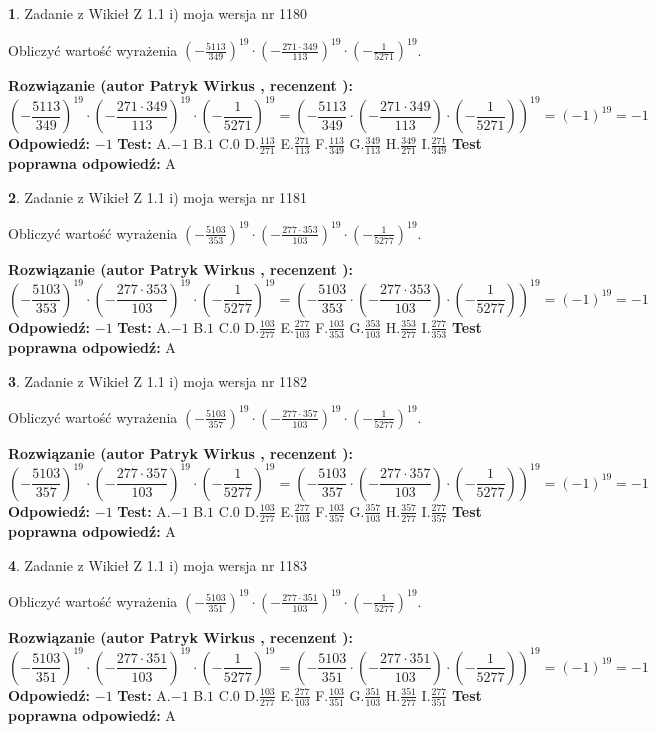 \documentclass[12pt, a4paper]{article}
\theoremstyle{definition} %
\newtheorem{zad}{}
\newcommand{\zadStart}[1]{\begin{zad}#1\newline}
\newcommand{\zadStop}{\end{zad}}
\newcommand{\rozwStart}[2]{\noindent \textbf{Rozwiązanie (autor #1 , recenzent #2): }\newline}
\newcommand{\rozwStop}{\newline}
\newcommand{\odpStart}{\noindent \textbf{Odpowiedź:}\newline}
\newcommand{\odpStop}{\newline}
\newcommand{\testStart}{\noindent \textbf{Test:}\newline}
\newcommand{\testStop}{\newline}
\newcommand{\kluczStart}{\noindent \textbf{Test poprawna odpowiedź:}\newline}
\newcommand{\kluczStop}{\newline}
\begin{document}
\zadStart{Zadanie z Wikieł Z 1.1 i) moja wersja nr 1180}

Obliczyć wartość wyrażenia $(-\frac{5113}{349})^{19} \cdot (-\frac{271 \cdot 349}{113})^{19} \cdot (-\frac{1}{5271})^{19}$.
\zadStop
\rozwStart{Patryk Wirkus}{}
$$(-\frac{5113}{349})^{19} \cdot (-\frac{271 \cdot 349}{113})^{19} \cdot (-\frac{1}{5271})^{19} = (-\frac{5113}{349} \cdot (-\frac{271 \cdot 349}{113}) \cdot (-\frac{1}{5271}))^{19} = (-1)^{19} = -1$$
\rozwStop
\odpStart
$-1$
\odpStop
\testStart
A.$-1$ B.$1$ C.$0$ D.$\frac{113}{271}$ E.$\frac{271}{113}$
F.$\frac{113}{349}$ G.$\frac{349}{113}$
H.$\frac{349}{271}$
I.$\frac{271}{349}$
\testStop
\kluczStart
A
\kluczStop



\zadStart{Zadanie z Wikieł Z 1.1 i) moja wersja nr 1181}

Obliczyć wartość wyrażenia $(-\frac{5103}{353})^{19} \cdot (-\frac{277 \cdot 353}{103})^{19} \cdot (-\frac{1}{5277})^{19}$.
\zadStop
\rozwStart{Patryk Wirkus}{}
$$(-\frac{5103}{353})^{19} \cdot (-\frac{277 \cdot 353}{103})^{19} \cdot (-\frac{1}{5277})^{19} = (-\frac{5103}{353} \cdot (-\frac{277 \cdot 353}{103}) \cdot (-\frac{1}{5277}))^{19} = (-1)^{19} = -1$$
\rozwStop
\odpStart
$-1$
\odpStop
\testStart
A.$-1$ B.$1$ C.$0$ D.$\frac{103}{277}$ E.$\frac{277}{103}$
F.$\frac{103}{353}$ G.$\frac{353}{103}$
H.$\frac{353}{277}$
I.$\frac{277}{353}$
\testStop
\kluczStart
A
\kluczStop



\zadStart{Zadanie z Wikieł Z 1.1 i) moja wersja nr 1182}

Obliczyć wartość wyrażenia $(-\frac{5103}{357})^{19} \cdot (-\frac{277 \cdot 357}{103})^{19} \cdot (-\frac{1}{5277})^{19}$.
\zadStop
\rozwStart{Patryk Wirkus}{}
$$(-\frac{5103}{357})^{19} \cdot (-\frac{277 \cdot 357}{103})^{19} \cdot (-\frac{1}{5277})^{19} = (-\frac{5103}{357} \cdot (-\frac{277 \cdot 357}{103}) \cdot (-\frac{1}{5277}))^{19} = (-1)^{19} = -1$$
\rozwStop
\odpStart
$-1$
\odpStop
\testStart
A.$-1$ B.$1$ C.$0$ D.$\frac{103}{277}$ E.$\frac{277}{103}$
F.$\frac{103}{357}$ G.$\frac{357}{103}$
H.$\frac{357}{277}$
I.$\frac{277}{357}$
\testStop
\kluczStart
A
\kluczStop



\zadStart{Zadanie z Wikieł Z 1.1 i) moja wersja nr 1183}

Obliczyć wartość wyrażenia $(-\frac{5103}{351})^{19} \cdot (-\frac{277 \cdot 351}{103})^{19} \cdot (-\frac{1}{5277})^{19}$.
\zadStop
\rozwStart{Patryk Wirkus}{}
$$(-\frac{5103}{351})^{19} \cdot (-\frac{277 \cdot 351}{103})^{19} \cdot (-\frac{1}{5277})^{19} = (-\frac{5103}{351} \cdot (-\frac{277 \cdot 351}{103}) \cdot (-\frac{1}{5277}))^{19} = (-1)^{19} = -1$$
\rozwStop
\odpStart
$-1$
\odpStop
\testStart
A.$-1$ B.$1$ C.$0$ D.$\frac{103}{277}$ E.$\frac{277}{103}$
F.$\frac{103}{351}$ G.$\frac{351}{103}$
H.$\frac{351}{277}$
I.$\frac{277}{351}$
\testStop
\kluczStart
A
\kluczStop
\end{document}
